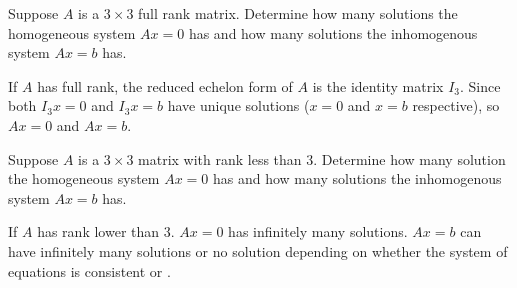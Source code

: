 \documentclass{ximera}
\begin{document}
\begin{exercise} \label{YZ_3.4.1}

Suppose $A$ is a $3\times 3$ full rank matrix. Determine how many solutions the homogeneous system $Ax=0$ has and how many solutions the inhomogenous system $Ax=b$ has.


\begin{solution}
\ans
If $A$ has full rank, the reduced echelon form of $A$ is the identity matrix $I_3$. Since both $I_3x=0$ and $I_3x=b$ have unique solutions ($x=0$ and $x=b$ respective), so  $Ax=0$ and $Ax=b$.

\end{solution}
\end{exercise}


\begin{exercise} \label{YZ_3.4.2}
Suppose $A$ is a $3\times 3$ matrix with rank less than $3$. Determine how many solution the homogeneous system $Ax=0$ has and how many solutions the inhomogenous system $Ax=b$ has.


\begin{solution}
\ans
If $A$ has rank lower than $3$. $Ax=0$ has infinitely many solutions. $Ax=b$ can have infinitely many solutions or no solution depending on whether the system of equations is consistent or .

\end{solution}
\end{exercise}
\end{document}
